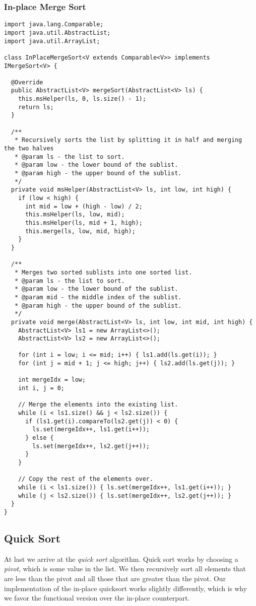 \subsubsection*{In-place Merge Sort}
\begin{lstlisting}[language=MyJava]
import java.lang.Comparable;
import java.util.AbstractList;
import java.util.ArrayList;

class InPlaceMergeSort<V extends Comparable<V>> implements IMergeSort<V> {

  @Override
  public AbstractList<V> mergeSort(AbstractList<V> ls) {
    this.msHelper(ls, 0, ls.size() - 1);
    return ls;
  }

  /**
   * Recursively sorts the list by splitting it in half and merging the two halves
   * @param ls - the list to sort.
   * @param low - the lower bound of the sublist. 
   * @param high - the upper bound of the sublist.
   */
  private void msHelper(AbstractList<V> ls, int low, int high) {
    if (low < high) {
      int mid = low + (high - low) / 2;
      this.msHelper(ls, low, mid);
      this.msHelper(ls, mid + 1, high);
      this.merge(ls, low, mid, high);
    }
  }

  /**
   * Merges two sorted sublists into one sorted list. 
   * @param ls - the list to sort.
   * @param low - the lower bound of the sublist.
   * @param mid - the middle index of the sublist.
   * @param high - the upper bound of the sublist.
   */
  private void merge(AbstractList<V> ls, int low, int mid, int high) {
    AbstractList<V> ls1 = new ArrayList<>();
    AbstractList<V> ls2 = new ArrayList<>();

    for (int i = low; i <= mid; i++) { ls1.add(ls.get(i)); }
    for (int j = mid + 1; j <= high; j++) { ls2.add(ls.get(j)); }

    int mergeIdx = low;
    int i, j = 0;
        
    // Merge the elements into the existing list.
    while (i < ls1.size() && j < ls2.size()) {
      if (ls1.get(i).compareTo(ls2.get(j)) < 0) { 
        ls.set(mergeIdx++, ls1.get(i++)); 
      } else { 
        ls.set(mergeIdx++, ls2.get(j++)); 
      }
    }

    // Copy the rest of the elements over.
    while (i < ls1.size()) { ls.set(mergeIdx++, ls1.get(i++)); }
    while (j < ls2.size()) { ls.set(mergeIdx++, ls2.get(j++)); }
  }
}
\end{lstlisting}

\subsection{Quick Sort}
At last we arrive at the \emph{quick sort} algorithm. Quick sort works by choosing a \emph{pivot}, which is some value in the list. We then recursively sort all elements that are less than the pivot and all those that are greater than the pivot. Our implementation of the in-place quicksort works slightly differently, which is why we favor the functional version over the in-place counterpart. 

